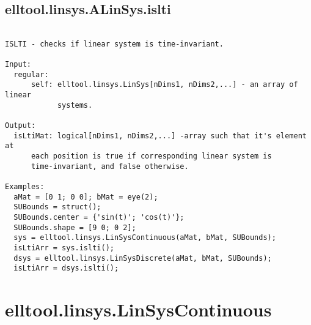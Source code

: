 \subsection{\texorpdfstring{elltool.linsys.ALinSys.islti}{islti}}\label{method:elltool.linsys.ALinSys.islti}
\begin{verbatim}

ISLTI - checks if linear system is time-invariant.

Input:
  regular:
      self: elltool.linsys.LinSys[nDims1, nDims2,...] - an array of linear
            systems.

Output:
  isLtiMat: logical[nDims1, nDims2,...] -array such that it's element at
      each position is true if corresponding linear system is
      time-invariant, and false otherwise.

Examples:
  aMat = [0 1; 0 0]; bMat = eye(2);
  SUBounds = struct();
  SUBounds.center = {'sin(t)'; 'cos(t)'};
  SUBounds.shape = [9 0; 0 2];
  sys = elltool.linsys.LinSysContinuous(aMat, bMat, SUBounds);
  isLtiArr = sys.islti();
  dsys = elltool.linsys.LinSysDiscrete(aMat, bMat, SUBounds);
  isLtiArr = dsys.islti();
\end{verbatim}
\section{elltool.linsys.LinSysContinuous}\label{secClassDescr:elltool.linsys.LinSysContinuous}
